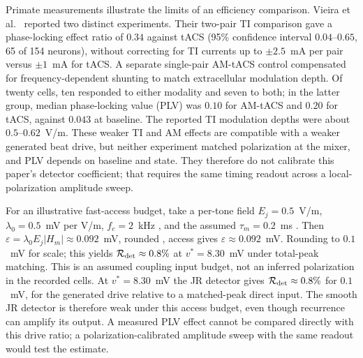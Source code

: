 \documentclass[11pt,a4paper]{article}
\providecommand{\DIFaddtex}[1]{{\protect\color{blue} \sf #1}} %
\providecommand{\DIFdeltex}[1]{{\protect\color{red} \scriptsize #1}} %
\providecommand{\DIFaddbegin}{} %
\providecommand{\DIFaddend}{} %
\providecommand{\DIFdelbegin}{} %
\providecommand{\DIFdelend}{} %
\providecommand{\DIFadd}[1]{\texorpdfstring{\DIFaddtex{#1}}{#1}} %
\providecommand{\DIFdel}[1]{\texorpdfstring{\DIFdeltex{#1}}{}} %
\begin{document}
\DIFdel{Primate measurements illustrate the limits of an efficiency comparison.
Vieira et al.\ \cite{vieira2024} reported two distinct experiments. Their
two-pair TI
comparison gave a phase-locking effect ratio of $0.34$ against
tACS (95\% confidence interval $0.04$--$0.65$, 65 of 154 neurons), without
correcting for TI currents up to
$\pm2.5$~mA per pair versus $\pm1$~mA for tACS.
A separate single-pair AM-tACS control compensated for frequency-dependent
shunting to match extracellular modulation depth. Of twenty cells, ten responded
to either modality and seven to both; in the latter group, median phase-locking
value (PLV) was $0.10$ for AM-tACS and $0.20$ for tACS, against $0.043$ at baseline.
The reported TI modulation depths were about $0.5$--$0.62$~V/m. These weaker
TI and AM effects are compatible with a weaker generated beat drive, but neither
experiment matched polarization at the mixer, and PLV depends on baseline and
state. They therefore do not calibrate this paper's detector coefficient; that
requires the same timing readout across a local-polarization amplitude sweep.
}%

\DIFdelend For \DIFdelbegin \DIFdel{an illustrative fast-access budget, take a per-tone field }\DIFdelend $E_j=0.5$~V/m, $\lambda_0=0.5$~mV per V/m, $f_c=2$~kHz \DIFdelbegin \DIFdel{, }\DIFdelend and the assumed
$\tau_m=0.2$~ms\DIFdelbegin \DIFdel{.
Then $\varepsilon=\lambda_0E_j|H_m|\approx0.092$~mV, rounded }\DIFdelend \DIFaddbegin \DIFadd{, access gives $\varepsilon\approx0.092$~mV. Rounding }\DIFaddend to
$0.1$~mV \DIFdelbegin \DIFdel{for
scale; this }\DIFdelend \DIFaddbegin \DIFadd{yields $\mathcal R_{\rm det}\approx0.8\%$ at $v^*=8.30$~mV
under total-peak matching. This }\DIFaddend is an assumed \DIFdelbegin \DIFdel{coupling }\DIFdelend \DIFaddbegin \DIFadd{input }\DIFaddend budget, not an inferred
polarization in \DIFdelbegin \DIFdel{the }\DIFdelend recorded cells.
\DIFdelbegin \DIFdel{At $v^*=8.30$~mV the JR detector gives
$\mathcal R_{\rm det}\approx0.8\%$ for $0.1$~mV, for the generated drive relative to a matched-peak direct input.
The smooth JR detector is therefore weak under this access budget, even though
recurrence can amplify its output. A measured PLV effect cannot be compared
directly with this drive ratio; a polarization-calibrated amplitude sweep with
the
same readout would test the estimate.
}\DIFdelend
\end{document}
